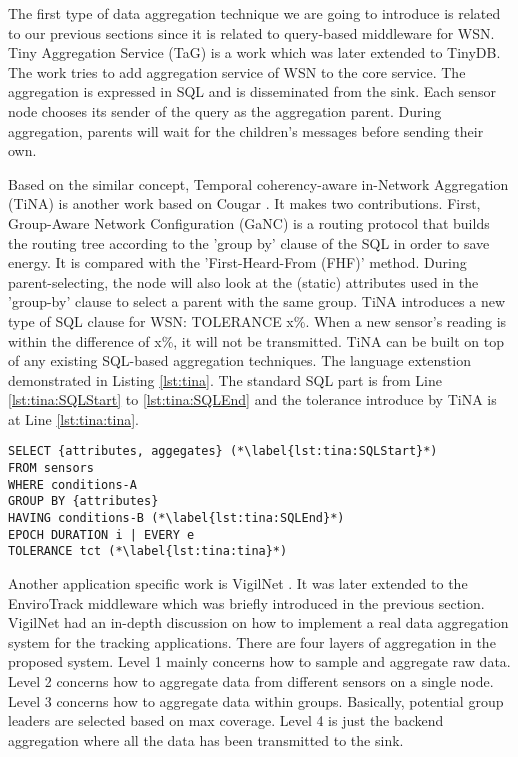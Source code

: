 The first type of data aggregation technique we are going to introduce is related to our previous sections since it is related to query-based middleware for WSN. Tiny Aggregation Service (TaG) \cite{tag} is a work which was later extended to TinyDB. The work tries to add aggregation service of WSN to the core service. The aggregation is expressed in SQL and is disseminated from the sink. Each sensor node chooses its sender of the query as the aggregation parent. During aggregation, parents will wait for the children's messages before sending their own.

Based on the similar concept, Temporal coherency-aware in-Network Aggregation (TiNA) \cite{tina} is another work based on Cougar \cite{cougar}. It makes two contributions. First, Group-Aware Network Configuration (GaNC) is a routing protocol that builds the routing tree according to the 'group by' clause of the SQL in order to save energy. It is compared with the 'First-Heard-From (FHF)' method. During parent-selecting, the node will also look at the (static) attributes used in the 'group-by' clause to select a parent with the same group. TiNA introduces a new type of SQL clause for WSN: TOLERANCE x\%. When a new sensor's reading is within the difference of x\%, it will not be transmitted. TiNA can be built on top of any existing SQL-based aggregation techniques. The language extenstion demonstrated in Listing \ref{lst:tina}. The standard SQL part is from Line \ref{lst:tina:SQLStart} to \ref{lst:tina:SQLEnd} and the tolerance introduce by TiNA is at Line \ref{lst:tina:tina}.

\begin{lstlisting}[caption=An example of TiNA, label=lst:tina]
SELECT {attributes, aggegates} (*\label{lst:tina:SQLStart}*)
FROM sensors
WHERE conditions-A
GROUP BY {attributes}
HAVING conditions-B (*\label{lst:tina:SQLEnd}*)
EPOCH DURATION i | EVERY e
TOLERANCE tct (*\label{lst:tina:tina}*)
\end{lstlisting}

Another application specific work is VigilNet \cite{vigilnet}. It was later extended to the EnviroTrack middleware \cite{envirotrack} which was briefly introduced in the previous section. VigilNet had an in-depth discussion on how to implement a real data aggregation system for the tracking applications. There are four layers of aggregation in the proposed system. Level 1 mainly concerns how to sample and aggregate raw data. Level 2 concerns how to aggregate data from different sensors on a single node. Level 3 concerns how to aggregate data within groups. Basically, potential group leaders are selected based on max coverage. Level 4 is just the backend aggregation where all the data has been transmitted to the sink.

